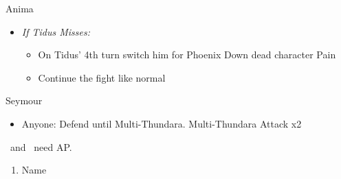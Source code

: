 \begin{battle}[18000]{Anima}
    \begin{itemize}
        \item \textit{If Tidus Misses:}
        \begin{itemize}
            \item On Tidus' 4th turn switch him for \lulu
            \luluf Phoenix Down dead character
            \enemyf Pain
            \item Continue the fight like normal
        \end{itemize}
    \end{itemize}
\end{battle}
\begin{battle}[6000]{Seymour}
    \begin{itemize}
        \tidusf Phoenix Down \rikku\ if she died before Multi-Thundara.
        \item Anyone: Defend until Multi-Thundara.
        \enemyf Multi-Thundara
        \tidusf Attack x2
    \end{itemize}
    \tidus\ and \yuna\ need AP.
\end{battle}
\begin{enumerate}[resume]
    \item Name \shiva
\end{enumerate}
